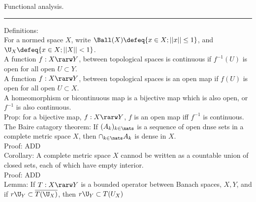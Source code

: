 
\break

\begin{flushleft}
Functional analysis. \\
\end{flushleft}

\begin{flushleft}
\addvspace{5pt} \hrule
\end{flushleft}	



Definitions: \\


\noindent
For a normed space $X$, write $\Ball(X) \defeq \{  x \in X; ||x|| \le 1 \}$, and $\U_X \defeq \{ x \in X; ||X|| < 1 \}$. \\

\noindent
A function $f:X \rarw Y$, between topological spaces is continuous if $f^{-1}(U)$ is open for all open $U \subset Y$. \\

\noindent
A function $f:X \rarw Y$, between topological spaces is an open map if $f(U)$ is open for all open $U \subset X$. \\

\noindent
A homeomorphism or bicontinuous map is a bijective map which is also open, or $f^{-1}$ is also continuous. \\


Prop: for a bijective map, $f:X \rarw Y$, $f$ is an open map iff $f^{-1}$ is continuous. \\


The Baire catagory theorem: If $( A_k )_{k \in \nats}$ is a sequence of open dnse sets in a complete metric space $X$, then $\cap_{k \in \nats} A_k$ is dense in $X$. \\

\noindent
Proof: ADD \\


Corollary: A complete metric space $X$ cannod be written as a countable union of closed sets, each of which have empty interior. \\

\noindent
Proof: ADD \\

Lemma: If $T: X \rarw Y$ is a bounded operator between Banach spaces, $X,Y$, and if $r \U_Y \subset \overline{ T( \U_X) }$, then $r \U_Y \subset T(U_X)$ \\

